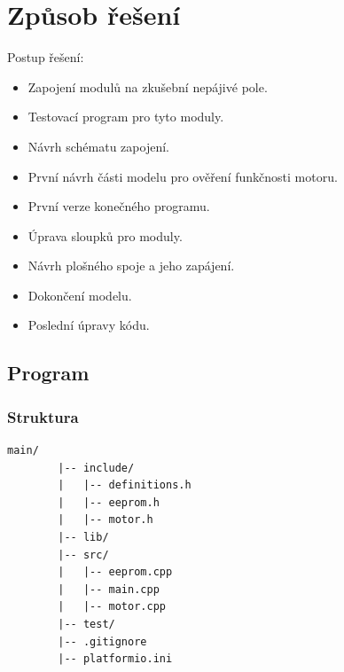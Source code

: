\documentclass[12pt, a4paper,
twoside,        %
openright
]{report}
\begin{document}
		
		
	\chapter{Způsob řešení}

	
	
	Postup řešení:
	\begin{itemize}
	\item Zapojení modulů na zkušební nepájivé pole.
	\item Testovací program pro tyto moduly.
	\item Návrh schématu zapojení.
	\item První návrh části modelu pro ověření funkčnosti motoru.
	\item První verze konečného programu.
	\item Úprava sloupků pro moduly.
	\item Návrh plošného spoje a jeho zapájení.
	\item Dokončení modelu.
	\item Poslední úpravy kódu.
	\end{itemize}


	
	

	\section[Program]{Program}
	
	\subsection{Struktura}
	
	\begin{lstlisting}[basicstyle=\ttfamily\small]
		main/
		|-- include/
		|   |-- definitions.h
		|   |-- eeprom.h
		|   |-- motor.h
		|-- lib/
		|-- src/
		|   |-- eeprom.cpp
		|   |-- main.cpp
		|   |-- motor.cpp
		|-- test/
		|-- .gitignore
		|-- platformio.ini
	\end{lstlisting}
\end{document}
